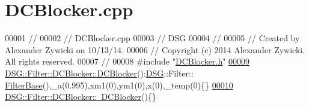 \hypertarget{_d_c_blocker_8cpp_source}{\section{D\+C\+Blocker.\+cpp}
\label{_d_c_blocker_8cpp_source}
}

\begin{DoxyCode}
00001 \textcolor{comment}{//}
00002 \textcolor{comment}{//  DCBlocker.cpp}
00003 \textcolor{comment}{//  DSG}
00004 \textcolor{comment}{//}
00005 \textcolor{comment}{//  Created by Alexander Zywicki on 10/13/14.}
00006 \textcolor{comment}{//  Copyright (c) 2014 Alexander Zywicki. All rights reserved.}
00007 \textcolor{comment}{//}
00008 \textcolor{preprocessor}{#include "\hyperlink{_d_c_blocker_8h}{DCBlocker.h}"}
\hypertarget{_d_c_blocker_8cpp_source_l00009}{}\hyperlink{class_d_s_g_1_1_filter_1_1_d_c_blocker_a71cb7abe6fca10f64402971d8b4a6eb3}{00009} \hyperlink{class_d_s_g_1_1_filter_1_1_d_c_blocker_a71cb7abe6fca10f64402971d8b4a6eb3}{DSG::Filter::DCBlocker::DCBlocker}():\hyperlink{namespace_d_s_g}{DSG}::Filter::
      \hyperlink{class_d_s_g_1_1_filter_1_1_filter_base}{FilterBase}(),\_a(0.995),xm1(0),ym1(0),x(0),\_temp(0)\{\}
\hypertarget{_d_c_blocker_8cpp_source_l00010}{}\hyperlink{class_d_s_g_1_1_filter_1_1_d_c_blocker_a5393dac29a226f5912f6d1705b69eecf}{00010} \hyperlink{class_d_s_g_1_1_filter_1_1_d_c_blocker_a5393dac29a226f5912f6d1705b69eecf}{DSG::Filter::DCBlocker::~DCBlocker}()\{\}
\end{DoxyCode}
